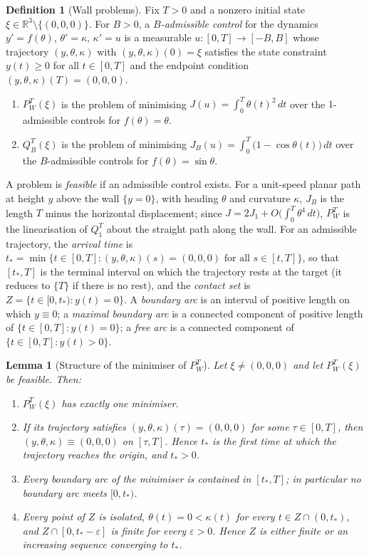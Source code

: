 \documentclass[11pt,reqno]{amsart}
\newtheorem{lemma}[theorem]{Lemma}
\theoremstyle{definition}
\newtheorem{definition}[theorem]{Definition}
\providecommand{\R}{\mathbb{R}}
\numberwithin{equation}{section}
\providecommand{\R}{\mathbb{R}}
\begin{document}
\begin{definition}[Wall problems]
\label{def:wall_problems}
Fix $T>0$ and a nonzero initial state $\xi\in\R^3\setminus\{(0,0,0)\}$. For $B>0$, a
\emph{$B$-admissible control} for the dynamics $y'=f(\theta)$, $\theta'=\kappa$, $\kappa'=u$ is a
measurable $u\colon[0,T]\to[-B,B]$ whose trajectory $(y,\theta,\kappa)$ with
$(y,\theta,\kappa)(0)=\xi$ satisfies the state constraint $y(t)\ge0$ for all $t\in[0,T]$ and the
endpoint condition $(y,\theta,\kappa)(T)=(0,0,0)$.
\begin{enumerate}
\item[(a)] $P_W^T(\xi)$ is the problem of minimising $J(u)=\int_0^T\theta(t)^2\,dt$ over the
  $1$-admissible controls for $f(\theta)=\theta$.
\item[(b)] $Q_B^T(\xi)$ is the problem of minimising $J_B(u)=\int_0^T\big(1-\cos\theta(t)\big)\,dt$
  over the $B$-admissible controls for $f(\theta)=\sin\theta$.
\end{enumerate}
A problem is \emph{feasible} if an admissible control exists. For a unit-speed planar path at height
$y$ above the wall $\{y=0\}$, with heading $\theta$ and curvature $\kappa$, $J_B$ is the length $T$
minus the horizontal displacement; since $J=2J_1+O\big(\int_0^T\theta^4\,dt\big)$, $P_W^T$ is the
linearisation of $Q_1^T$ about the straight path along the wall. For an admissible trajectory, the
\emph{arrival time} is
$t_*=\min\{t\in[0,T]:(y,\theta,\kappa)(s)=(0,0,0)\text{ for all }s\in[t,T]\}$, so that $[t_*,T]$ is the
terminal interval on which the trajectory rests at the target (it reduces to $\{T\}$ if there is no
rest), and the \emph{contact set} is $Z=\{t\in[0,t_*):y(t)=0\}$. A \emph{boundary arc} is an interval
of positive length on which $y\equiv0$; a \emph{maximal boundary arc} is a connected component of
positive length of $\{t\in[0,T]:y(t)=0\}$; a \emph{free arc} is a connected component of
$\{t\in[0,T]:y(t)>0\}$.
\end{definition}

\begin{lemma}[Structure of the minimiser of $P_W^T$]
\label{lem:wall_structure}
Let $\xi\ne(0,0,0)$ and let $P_W^T(\xi)$ be feasible. Then:
\begin{enumerate}
\item[(a)] $P_W^T(\xi)$ has exactly one minimiser.
\item[(b)] If its trajectory satisfies $(y,\theta,\kappa)(\tau)=(0,0,0)$ for some $\tau\in[0,T]$, then
  $(y,\theta,\kappa)\equiv(0,0,0)$ on $[\tau,T]$. Hence $t_*$ is the first time at which the
  trajectory reaches the origin, and $t_*>0$.
\item[(c)] Every boundary arc of the minimiser is contained in $[t_*,T]$; in particular no boundary arc
  meets $[0,t_*)$.
\item[(d)] Every point of $Z$ is isolated, $\theta(t)=0<\kappa(t)$ for every $t\in Z\cap(0,t_*)$, and
  $Z\cap[0,t_*-\varepsilon]$ is finite for every $\varepsilon>0$. Hence $Z$ is either finite or an
  increasing sequence converging to $t_*$.
\end{enumerate}
\end{lemma}
\end{document}
